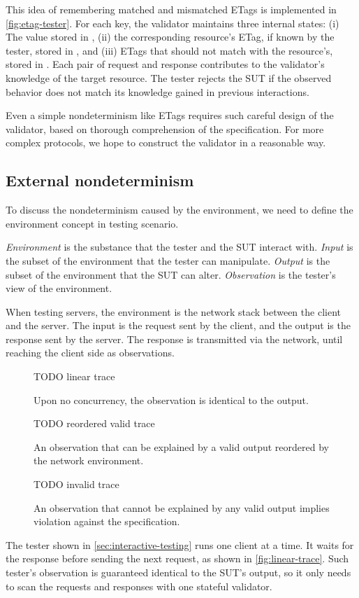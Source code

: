 This idea of remembering matched and mismatched ETags is implemented in
\autoref{fig:etag-tester}.  For each key, the validator maintains three internal
states: (i) The value stored in , (ii) the corresponding resource's
ETag, if known by the tester, stored in , and (iii) ETags that
should not match with the resource's, stored in .  Each pair of
request and response contributes to the validator's knowledge of the target
resource.  The tester rejects the SUT if the observed behavior does not match
its knowledge gained in previous interactions.

Even a simple nondeterminism like ETags requires such careful design of the
validator, based on thorough comprehension of the specification.  For more
complex protocols, we hope to construct the validator in a reasonable way.

\subsection{External nondeterminism}
To discuss the nondeterminism caused by the environment, we need to define the
environment concept in testing scenario.
\begin{definition}
  {\em Environment} is the substance that the tester and the SUT interact with.
  {\em Input} is the subset of the environment that the tester can manipulate.
  {\em Output} is the subset of the environment that the SUT can alter.  {\em
    Observation} is the tester's view of the environment.
\end{definition}
When testing servers, the environment is the network stack between the client
and the server.  The input is the request sent by the client, and the output is
the response sent by the server.  The response is transmitted via the network,
until reaching the client side as observations.

\begin{figure}
  TODO linear trace
  \caption[Linear trace upon no concurrency.]{Upon no concurrency, the
    observation is identical to the output.}
  \label{fig:linear-trace}
\end{figure}
\begin{figure}
  TODO reordered valid trace
  \caption[Reordered trace upon network delays.]{An observation that can be
    explained by a valid output reordered by the network environment.}
  \label{fig:reordered-trace}
\end{figure}
\begin{figure}
  TODO invalid trace
  \caption[Invalid trace that violates the specification.]{An observation that
    cannot be explained by any valid output implies violation against the
    specification.}
  \label{fig:invalid-trace}
\end{figure}
The tester shown in \autoref{sec:interactive-testing} runs one client at a time.
It waits for the response before sending the next request, as shown in
\autoref{fig:linear-trace}.  Such tester's observation is guaranteed identical
to the SUT's output, so it only needs to scan the requests and responses with
one stateful validator.

